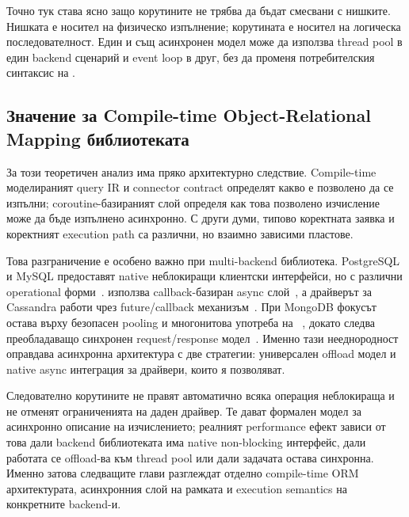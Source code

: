 Точно тук става ясно защо корутините не трябва да бъдат смесвани с нишките. Нишката е носител на физическо изпълнение; корутината е носител на логическа последователност. Един и същ асинхронен модел може да използва thread pool в един backend сценарий и event loop в друг, без да променя потребителския синтаксис на .

\subsection{Значение за Compile-time Object-Relational Mapping библиотеката}

За \ORMName{} този теоретичен анализ има пряко архитектурно следствие. Compile-time моделираният query IR и connector contract определят какво е позволено да се изпълни; coroutine-базираният слой определя как това позволено изчисление може да бъде изпълнено асинхронно. С други думи, типово коректната заявка и коректният execution path са различни, но взаимно зависими пластове.

Това разграничение е особено важно при multi-backend библиотека. PostgreSQL и MySQL предоставят native неблокиращи клиентски интерфейси, но с различни operational форми~\cite{libpq_async,mysql_capi_async}.  използва callback-базиран async слой~\cite{hiredis}, а драйверът за Cassandra работи чрез future/callback механизъм~\cite{cassandra_futures}. При MongoDB фокусът остава върху безопасен pooling и многонитова употреба на ~\cite{mongoc_client_pool}, докато  следва преобладаващо синхронен request/response модел~\cite{libneo4j_client}. Именно тази нееднородност оправдава асинхронна архитектура с две стратегии: универсален offload модел и native async интеграция за драйвери, които я позволяват.

Следователно корутините не правят автоматично всяка операция неблокираща и не отменят ограниченията на даден драйвер. Те дават формален модел за асинхронно описание на изчислението; реалният performance ефект зависи от това дали backend библиотеката има native non-blocking интерфейс, дали работата се offload-ва към thread pool или дали задачата остава синхронна. Именно затова следващите глави разглеждат отделно compile-time ORM архитектурата, асинхронния слой на рамката и execution semantics на конкретните backend-и.
